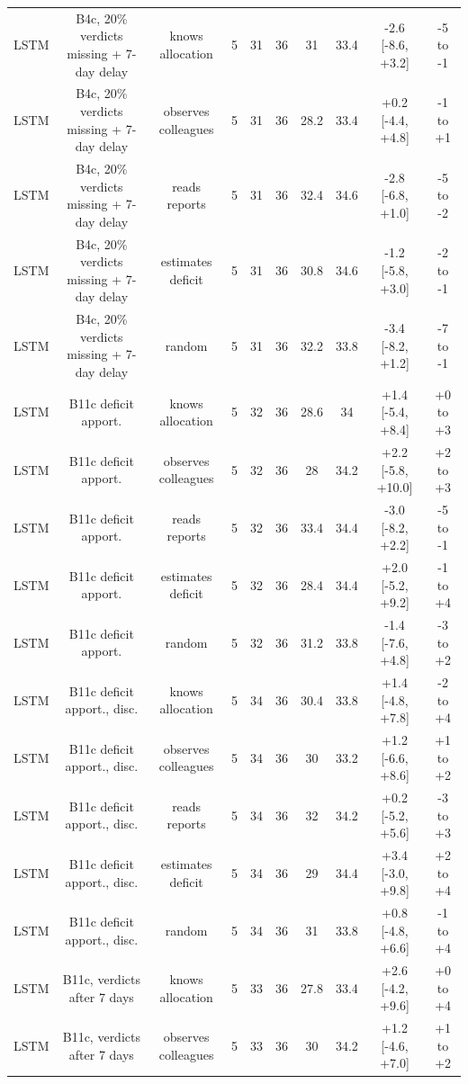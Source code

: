 \documentclass[10pt,onecolumn,letterpaper]{article}
\begin{document}
\begin{table}[!t]
{\begin{tabular}{lccccccccc}
LSTM & B4c, 20\% verdicts missing + 7-day delay & knows allocation & 5 & 31 & 36 & 31 & 33.4 & -2.6 [-8.6, +3.2] & -5 to -1 \\
LSTM & B4c, 20\% verdicts missing + 7-day delay & observes colleagues & 5 & 31 & 36 & 28.2 & 33.4 & +0.2 [-4.4, +4.8] & -1 to +1 \\
LSTM & B4c, 20\% verdicts missing + 7-day delay & reads reports & 5 & 31 & 36 & 32.4 & 34.6 & -2.8 [-6.8, +1.0] & -5 to -2 \\
LSTM & B4c, 20\% verdicts missing + 7-day delay & estimates deficit & 5 & 31 & 36 & 30.8 & 34.6 & -1.2 [-5.8, +3.0] & -2 to -1 \\
LSTM & B4c, 20\% verdicts missing + 7-day delay & random & 5 & 31 & 36 & 32.2 & 33.8 & -3.4 [-8.2, +1.2] & -7 to -1 \\
LSTM & B11c deficit apport. & knows allocation & 5 & 32 & 36 & 28.6 & 34 & +1.4 [-5.4, +8.4] & +0 to +3 \\
LSTM & B11c deficit apport. & observes colleagues & 5 & 32 & 36 & 28 & 34.2 & +2.2 [-5.8, +10.0] & +2 to +3 \\
LSTM & B11c deficit apport. & reads reports & 5 & 32 & 36 & 33.4 & 34.4 & -3.0 [-8.2, +2.2] & -5 to -1 \\
LSTM & B11c deficit apport. & estimates deficit & 5 & 32 & 36 & 28.4 & 34.4 & +2.0 [-5.2, +9.2] & -1 to +4 \\
LSTM & B11c deficit apport. & random & 5 & 32 & 36 & 31.2 & 33.8 & -1.4 [-7.6, +4.8] & -3 to +2 \\
LSTM & B11c deficit apport., disc. & knows allocation & 5 & 34 & 36 & 30.4 & 33.8 & +1.4 [-4.8, +7.8] & -2 to +4 \\
LSTM & B11c deficit apport., disc. & observes colleagues & 5 & 34 & 36 & 30 & 33.2 & +1.2 [-6.6, +8.6] & +1 to +2 \\
LSTM & B11c deficit apport., disc. & reads reports & 5 & 34 & 36 & 32 & 34.2 & +0.2 [-5.2, +5.6] & -3 to +3 \\
LSTM & B11c deficit apport., disc. & estimates deficit & 5 & 34 & 36 & 29 & 34.4 & +3.4 [-3.0, +9.8] & +2 to +4 \\
LSTM & B11c deficit apport., disc. & random & 5 & 34 & 36 & 31 & 33.8 & +0.8 [-4.8, +6.6] & -1 to +4 \\
LSTM & B11c, verdicts after 7 days & knows allocation & 5 & 33 & 36 & 27.8 & 33.4 & +2.6 [-4.2, +9.6] & +0 to +4 \\
LSTM & B11c, verdicts after 7 days & observes colleagues & 5 & 33 & 36 & 30 & 34.2 & +1.2 [-4.6, +7.0] & +1 to +2 \\

\end{tabular}}
\end{table}
\end{document}
